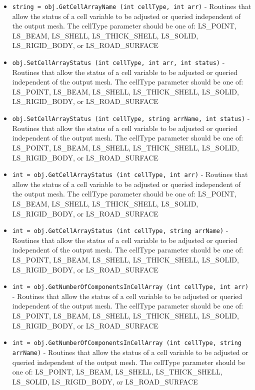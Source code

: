 \begin{itemize}
\item  \verb|string = obj.GetCellArrayName (int cellType, int arr)| -  Routines that allow the status of a cell variable to be adjusted or
 queried independent of the output mesh.  The  cellType parameter
 should be one of: LS\_POINT, LS\_BEAM, LS\_SHELL, LS\_THICK\_SHELL,
 LS\_SOLID, LS\_RIGID\_BODY, or LS\_ROAD\_SURFACE

\item  \verb|obj.SetCellArrayStatus (int cellType, int arr, int status)| -  Routines that allow the status of a cell variable to be adjusted or
 queried independent of the output mesh.  The  cellType parameter
 should be one of: LS\_POINT, LS\_BEAM, LS\_SHELL, LS\_THICK\_SHELL,
 LS\_SOLID, LS\_RIGID\_BODY, or LS\_ROAD\_SURFACE

\item  \verb|obj.SetCellArrayStatus (int cellType, string arrName, int status)| -  Routines that allow the status of a cell variable to be adjusted or
 queried independent of the output mesh.  The  cellType parameter
 should be one of: LS\_POINT, LS\_BEAM, LS\_SHELL, LS\_THICK\_SHELL,
 LS\_SOLID, LS\_RIGID\_BODY, or LS\_ROAD\_SURFACE

\item  \verb|int = obj.GetCellArrayStatus (int cellType, int arr)| -  Routines that allow the status of a cell variable to be adjusted or
 queried independent of the output mesh.  The  cellType parameter
 should be one of: LS\_POINT, LS\_BEAM, LS\_SHELL, LS\_THICK\_SHELL,
 LS\_SOLID, LS\_RIGID\_BODY, or LS\_ROAD\_SURFACE

\item  \verb|int = obj.GetCellArrayStatus (int cellType, string arrName)| -  Routines that allow the status of a cell variable to be adjusted or
 queried independent of the output mesh.  The  cellType parameter
 should be one of: LS\_POINT, LS\_BEAM, LS\_SHELL, LS\_THICK\_SHELL,
 LS\_SOLID, LS\_RIGID\_BODY, or LS\_ROAD\_SURFACE

\item  \verb|int = obj.GetNumberOfComponentsInCellArray (int cellType, int arr)| -  Routines that allow the status of a cell variable to be adjusted or
 queried independent of the output mesh.  The  cellType parameter
 should be one of: LS\_POINT, LS\_BEAM, LS\_SHELL, LS\_THICK\_SHELL,
 LS\_SOLID, LS\_RIGID\_BODY, or LS\_ROAD\_SURFACE

\item  \verb|int = obj.GetNumberOfComponentsInCellArray (int cellType, string arrName)| -  Routines that allow the status of a cell variable to be adjusted or
 queried independent of the output mesh.  The  cellType parameter
 should be one of: LS\_POINT, LS\_BEAM, LS\_SHELL, LS\_THICK\_SHELL,
 LS\_SOLID, LS\_RIGID\_BODY, or LS\_ROAD\_SURFACE


\end{itemize}

